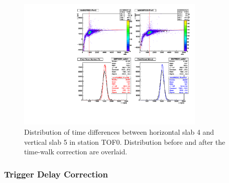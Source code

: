 \begin{figure}
  \begin{center}
  \includegraphics[clip,trim=0 0 10cm 8.5cm, width=9cm]{02_slab_dt_resolution_tw_effect}
  \caption{Distribution of time differences \DT{} between horizontal slab 4 and
    vertical slab 5 in station TOF0. Distribution before and after the
  time-walk correction are overlaid.}
  \label{fig:SlabDTTW}
  \end{center}
\end{figure}


\subsubsection{Trigger Delay Correction}

\newcommand{\Tdelay}[2]{\ensuremath{T_{\text{tr}}^{#1,#2}}}
\newcommand{\TW}{\ensuremath{\text{TW}}}
\newcommand{\PMT}{\ensuremath{\text{PMT}}}
\newcommand{\ttrig}[2]{\ensuremath{{t}_{#2}^{#1}}}
\newcommand{\mean}[1]{\ensuremath{\left< #1 \right>}}


